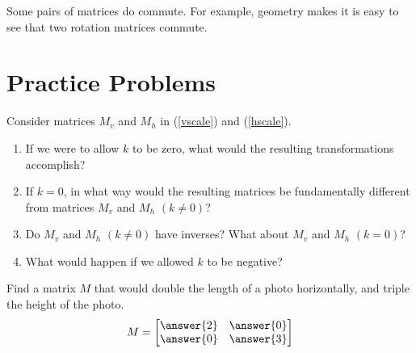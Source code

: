 \documentclass{ximera}
\begin{document}
\begin{example}\label{ex:rotationscommute}
Some pairs of matrices do commute.  For example, geometry makes it is easy to see that two rotation matrices commute.
\end{example}

\section*{Practice Problems}
\begin{problem}\label{prob:k0}
Consider matrices $M_v$ and $M_h$ in (\ref{vscale}) and (\ref{hscale}).  
\begin{enumerate}
\item
If we were to allow $k$ to be zero, what would the resulting transformations accomplish?  
\item If $k=0$, in what way would the resulting matrices be fundamentally different from matrices $M_v$ and $M_h$ $(k\neq 0)$?  
\item Do $M_v$ and $M_h$ $(k\neq 0)$ have inverses?  What about $M_v$ and $M_h$ $(k= 0)$?  
\item What would happen if we allowed $k$ to be negative?
\end{enumerate}
\end{problem}

\begin{problem}\label{prob:matrixlintrans} Find a matrix $M$ that would double the length of a photo horizontally, and triple the height of the photo.
$$M=\begin{bmatrix}\answer{2} & \answer{0}\\\answer{0} & \answer{3}\end{bmatrix}$$
\end{problem}
\end{document}
